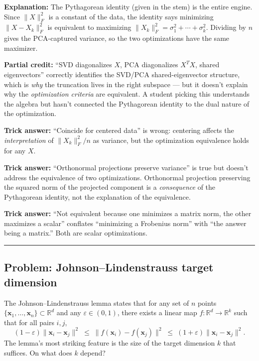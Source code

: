 \documentclass[12pt]{amsart}
\newcommand{\divider}{
  \vspace{-1em}
  \noindent
  \raisebox{-0.15ex}{\textbullet}%
  \hspace{0.5em}%
  \rule[0.5ex]{0.95\textwidth}{1.0pt}%
  \hspace{0.5em}%
  \raisebox{-0.15ex}{\textbullet}%
  \vspace{0em}
}
\begin{document}
\textbf{Explanation:}
The Pythagorean identity (given in the stem) is the entire engine. Since
$\|X\|_F^2$ is a constant of the data, the identity says minimizing
$\|X - X_k\|_F^2$ is equivalent to maximizing
$\|X_k\|_F^2 = \sigma_1^2 + \cdots + \sigma_k^2$. Dividing by $n$ gives the
PCA-captured variance, so the two optimizations have the same maximizer.

\textbf{Partial credit:}
``SVD diagonalizes $X$, PCA diagonalizes $X^TX$, shared eigenvectors''
correctly identifies the SVD/PCA shared-eigenvector structure, which is
\emph{why} the truncation lives in the right subspace --- but it doesn't
explain why the \emph{optimization criteria} are equivalent. A student
picking this understands the algebra but hasn't connected the Pythagorean
identity to the dual nature of the optimization.

\textbf{Trick answer:}
``Coincide for centered data'' is wrong: centering affects the
\emph{interpretation} of $\|X_k\|_F^2/n$ as variance, but the
optimization equivalence holds for any $X$.

\textbf{Trick answer:}
``Orthonormal projections preserve variance'' is true but doesn't address
the equivalence of two optimizations. Orthonormal projection preserving
the squared norm of the projected component is a \emph{consequence} of
the Pythagorean identity, not the explanation of the equivalence.

\textbf{Trick answer:}
``Not equivalent because one minimizes a matrix norm, the other maximizes
a scalar'' conflates ``minimizing a Frobenius norm'' with ``the answer being
a matrix.'' Both are scalar optimizations.

\divider

\subsection*{Problem: Johnson--Lindenstrauss target dimension}

The Johnson--Lindenstrauss lemma states that for any set of $n$ points
$\{\mathbf{x}_1, \ldots, \mathbf{x}_n\} \subset \mathbb{R}^d$ and any
$\varepsilon \in (0, 1)$, there exists a linear map
$f : \mathbb{R}^d \to \mathbb{R}^k$ such that for all pairs $i, j$,
$$(1-\varepsilon)\|\mathbf{x}_i - \mathbf{x}_j\|^2 \;\leq\;
\|f(\mathbf{x}_i) - f(\mathbf{x}_j)\|^2 \;\leq\;
(1+\varepsilon)\|\mathbf{x}_i - \mathbf{x}_j\|^2.$$
The lemma's most striking feature is the size of the target dimension $k$
that suffices. On what does $k$ depend?
\end{document}
